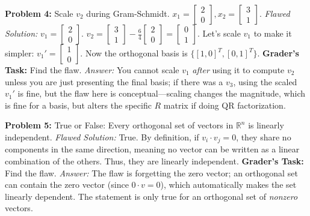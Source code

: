 \documentclass[11pt, letterpaper]{article}
\theoremstyle{definition}
\theoremstyle{remark}
\newcommand{\R}{\mathbb{R}}
\begin{document}
\textbf{Problem 4:} Scale $v_2$ during Gram-Schmidt. $x_1 = \begin{bmatrix} 2 \\ 0 \end{bmatrix}, x_2 = \begin{bmatrix} 3 \\ 1 \end{bmatrix}$.
\textit{Flawed Solution:}
$v_1 = \begin{bmatrix} 2 \\ 0 \end{bmatrix}$. $v_2 = \begin{bmatrix} 3 \\ 1 \end{bmatrix} - \frac{6}{4}\begin{bmatrix} 2 \\ 0 \end{bmatrix} = \begin{bmatrix} 0 \\ 1 \end{bmatrix}$.
Let's scale $v_1$ to make it simpler: $v_1' = \begin{bmatrix} 1 \\ 0 \end{bmatrix}$.
Now the orthogonal basis is $\{[1, 0]^T, [0, 1]^T\}$.
\textbf{Grader's Task:} Find the flaw.
\textit{Answer:} You cannot scale $v_1$ \textit{after} using it to compute $v_2$ unless you are just presenting the final basis; if there was a $v_3$, using the scaled $v_1'$ is fine, but the flaw here is conceptual—scaling changes the magnitude, which is fine for a basis, but alters the specific $R$ matrix if doing QR factorization.

\textbf{Problem 5:} True or False: Every orthogonal set of vectors in $\R^n$ is linearly independent.
\textit{Flawed Solution:} True. By definition, if $v_i \cdot v_j = 0$, they share no components in the same direction, meaning no vector can be written as a linear combination of the others. Thus, they are linearly independent.
\textbf{Grader's Task:} Find the flaw.
\textit{Answer:} The flaw is forgetting the zero vector; an orthogonal set can contain the zero vector (since $0 \cdot v = 0$), which automatically makes the set linearly dependent. The statement is only true for an orthogonal set of \textit{nonzero} vectors.
\end{document}
